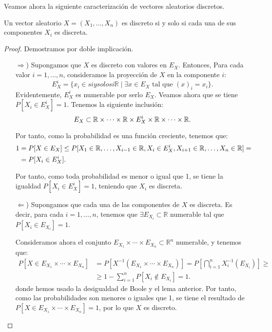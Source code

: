 Veamos ahora la siguiente caracterización de vectores aleatorios discretos.
\begin{teo}
    Un vector aleatorio $X=(X_1, \ldots, X_n)$ es discreto si y solo si cada una de sus componentes $X_i$ es discreta.
\end{teo}
\begin{proof} Demostramos por doble implicación.
    \begin{itemize}
        \item[$\Longrightarrow$)] Supongamos que $X$ es discreto con valores en $E_X$. Entonces, Para cada valor $i=1, \ldots, n$, consideramos la proyección de $X$ en la componente $i$:
        \begin{equation*}
            E_X^i = \{x_i\in si y solo si  \mathbb{R} \mid \exists x\in E_X \text{ tal que } (x)_i = x_i\}.
        \end{equation*}
        Evidentemente, $E_X^i$ es numerable por serlo $E_X$. Veamos ahora que se tiene $P[X_i\in E_X^i] = 1$. Tenemos la siguiente inclusión:
        \begin{equation*}
            E_X\subset \mathbb{R} \times \cdots \times \mathbb{R}\times E_X^i \times \mathbb{R}\times \cdots \times \mathbb{R}.
        \end{equation*}

        Por tanto, como la probabilidad es una función creciente, tenemos que:
        \begin{align*}
            1&= P[X\in E_X] \leq P[X_1\in \mathbb{R}, \ldots, X_{i-1}\in \mathbb{R}, X_i\in E_X^i, X_{i+1}\in \mathbb{R}, \ldots, X_n\in \mathbb{R}] =\\
            &= P[X_i\in E_X^i].
        \end{align*}

        Por tanto, como toda probabilidad es menor o igual que 1, se tiene la igualdad $P[X_i\in E_X^i] = 1$, teniendo que $X_i$ es discreta.

        \item[$\Longleftarrow$)] Supongamos que cada una de las componentes de $X$ es discreta. Es decir, para cada $i=1, \ldots, n$, tenemos que $\exists E_{X_i}\subset \mathbb{R}$ numerable tal que $P[X_i\in E_{X_i}] = 1$.
        
        Consideramos ahora el conjunto $E_{X_1}\times \cdots \times E_{X_n}\subset \mathbb{R}^n$ numerable, y tenemos que:
        \begin{align*}
            P[X\in E_{X_1}\times \cdots \times E_{X_n}] &= P\left[X^{-1}(E_{X_1}\times \cdots \times E_{X_n})\right]
            = P\left[\bigcap_{i=1}^n X_i^{-1}(E_{X_i})\right] \geq \\
            &\geq 1- \sum_{i=1}^n P[X_i\notin E_{X_i}] = 1.
        \end{align*}
        donde hemos usado la desigualdad de Boole y el lema anterior. Por tanto, como las probabilidades son menores o iguales que 1, se tiene el resultado de $P[X\in E_{X_1}\times \cdots \times E_{X_n}] = 1$, por lo que $X$ es discreto.
    \end{itemize}
\end{proof}

